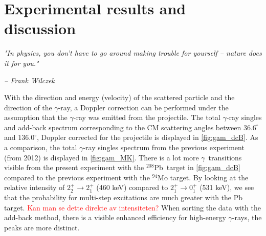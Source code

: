 \documentclass[twoside,english]{uiofysmaster/uiofysmaster}
\newcommand{\Pb}{$^{208}$Pb}
\newcommand{\ga}{$\gamma$}
\let\orgautoref\autoref
\renewcommand{\autoref}
        {%
		 \def\sectionautorefname{Section}%
		 \def\subsectionautorefname{Section}%
		 \def\subsubsectionautorefname{Section}%
		 \def\chapterautorefname{Chapter}%
          \orgautoref}
\begin{document}


\chapter{Experimental results and discussion}
\epigraph{\textit{"In physics, you don't have to go around making trouble for yourself – nature does it for you."}}{\textit{– Frank Wilczek}}


With the direction and energy (velocity) of the scattered particle and the direction of the \ga-ray, a Doppler correction can be performed under the assumption that the \ga-ray was emitted from the projectile. 
The total \ga-ray singles and add-back spectrum corresponding to the CM scattering angles between $36.6^\circ$ and $136.0^\circ$, Doppler corrected for the projectile is displayed in \autoref{fig:gam_dcB}. 
As a comparison, the total \ga-ray singles spectrum from the previous experiment (from 2012) is displayed in \autoref{fig:gam_MK}.
There is a lot more \ga\ transitions visible from the present experiment with the \Pb\ target in \autoref{fig:gam_dcB} compared to the previous experiment with the $^{94}$Mo target. 
By looking at the relative intensity of $2_2^+ \rightarrow 2_1^+$ (460 keV) compared to $2_1^+ \rightarrow 0_1^+$ (531 keV), we see that the probability for multi-step excitations are much greater with the Pb target. \textcolor{red}{Kan man se dette direkte av intensiteten?}
When sorting the data with the add-back method, there is a visible enhanced efficiency for high-energy \ga-rays, the peaks are more distinct. 
\end{document}
